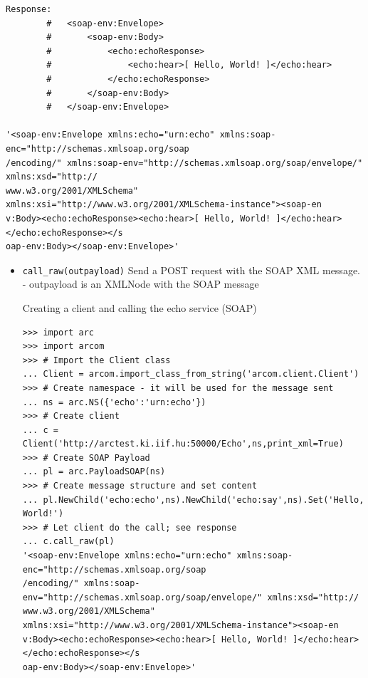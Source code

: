 \documentclass{article}
\begin{document}
\begin{flushleft}
\begin{itemize}
{\begin{example}
\begin{verbatim}
Response:
        #   <soap-env:Envelope>
        #       <soap-env:Body>
        #           <echo:echoResponse>
        #               <echo:hear>[ Hello, World! ]</echo:hear>
        #           </echo:echoResponse>
        #       </soap-env:Body>
        #   </soap-env:Envelope>

'<soap-env:Envelope xmlns:echo="urn:echo" xmlns:soap-enc="http://schemas.xmlsoap.org/soap
/encoding/" xmlns:soap-env="http://schemas.xmlsoap.org/soap/envelope/" xmlns:xsd="http://
www.w3.org/2001/XMLSchema" xmlns:xsi="http://www.w3.org/2001/XMLSchema-instance"><soap-en
v:Body><echo:echoResponse><echo:hear>[ Hello, World! ]</echo:hear></echo:echoResponse></s
oap-env:Body></soap-env:Envelope>'
\end{verbatim}
    \end{example}
  }
\end{itemize}
\begin{itemize}
  \item{ \verb$call_raw(outpayload)$\newline
  Send a POST request with the SOAP XML message.\newline
  - outpayload is an XMLNode with the SOAP message
    \begin{example}
      \caption{Creating a client and calling the echo service (SOAP)}\label{clientex2}
\begin{verbatim}
>>> import arc
>>> import arcom
>>> # Import the Client class
... Client = arcom.import_class_from_string('arcom.client.Client')
>>> # Create namespace - it will be used for the message sent
... ns = arc.NS({'echo':'urn:echo'})
>>> # Create client
... c = Client('http://arctest.ki.iif.hu:50000/Echo',ns,print_xml=True)
>>> # Create SOAP Payload
... pl = arc.PayloadSOAP(ns)
>>> # Create message structure and set content
... pl.NewChild('echo:echo',ns).NewChild('echo:say',ns).Set('Hello, World!')
>>> # Let client do the call; see response
... c.call_raw(pl)
'<soap-env:Envelope xmlns:echo="urn:echo" xmlns:soap-enc="http://schemas.xmlsoap.org/soap
/encoding/" xmlns:soap-env="http://schemas.xmlsoap.org/soap/envelope/" xmlns:xsd="http://
www.w3.org/2001/XMLSchema" xmlns:xsi="http://www.w3.org/2001/XMLSchema-instance"><soap-en
v:Body><echo:echoResponse><echo:hear>[ Hello, World! ]</echo:hear></echo:echoResponse></s
oap-env:Body></soap-env:Envelope>'
\end{verbatim}
    \end{example}
  }
\end{itemize}
\end{flushleft}
\end{document}
